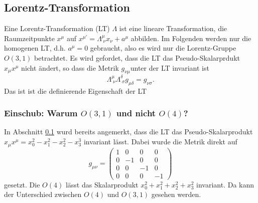 \documentclass[
  captions=tableheading,  %
  titlepage=firstiscover, %
]{scrartcl}
\begin{document}
\subsection{Lorentz-Transformation}
\label{sub:LT}
Eine Lorentz-Transformation (LT) $\Lambda$ ist eine lineare Transformation, die 
Raumzeitpunkte $x^{\mu}$  auf  $x^{\mu ' } = \Lambda_{\; \nu}^{\mu} x_{\nu} + a^{\mu}$ abbilden.
Im Folgenden werden nur die homogenen LT, d.h. $a^{\mu} = 0$ gebraucht, also es wird nur die Lorentz-Gruppe 
$O(3,1)$ betrachtet.
Es wird gefordet, dass die LT das Pseudo-Skalarprdukt $x_{\mu}x^{\mu}$ nicht ändert, so dass die Metrik $g_{\nu \mu}$unter 
der LT invariant ist 
\begin{equation*}
  \Lambda_{\; \nu}^{\mu} \Lambda_{\; \sigma}^{\delta} g_{\mu \delta} = g_{\nu \sigma}.
\end{equation*}
Das ist ist die definierende Eigenschaft der LT
\subsubsection{Einschub: Warum \texorpdfstring{$O(3,1)$}{PDFstring} und nicht \texorpdfstring{$O(4)$}{PDFstring}?}
In Abschnitt \ref{sub:LT} wurd bereits angemerkt, dass die LT das Pseudo-Skalarprodukt $x_{\mu}x^{\mu} = x_0^2 - x_1^2 - x_2^2 - x_3^3$
invariant lässt.
Dabei wurde die Metrik direkt auf 
\begin{equation*}
  g_{\mu \nu} = 
  \begin{pmatrix}
    1 & 0   & 0   & 0 \\
    0 & -1  & 0   & 0 \\
    0 & 0   & -1  & 0 \\
    0 & 0   & 0   & -1 
  \end{pmatrix}
\end{equation*}
gesetzt. 
Die $O(4)$ lässt das Skalarprodukt $x_0^2 + x_1^2 + x_2^2 + x_3^2$ invariant.
Da kann der Unterschied zwischen $O(4)$ und $O(3,1)$ gesehen werden.
\end{document}
